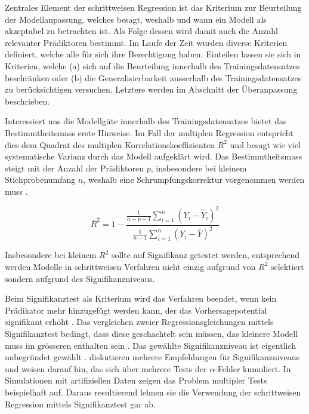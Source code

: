 Zentrales Element der schrittweisen Regression ist das Kriterium zur Beurteilung der  Modellanpassung, welches besagt, weshalb und wann ein Modell als akzeptabel zu betrachten ist. Als Folge dessen wird damit auch die Anzahl relevanter Prädiktoren bestimmt. Im Laufe der Zeit wurden diverse Kriterien definiert, welche alle für sich ihre Berechtigung haben.
Einteilen lassen sie sich in Kriterien, welche (a) sich auf die Beurteilung innerhalb des Trainingsdatensatzes beschränken oder (b) die Generalisierbarkeit ausserhalb des Trainingsdatensatzes zu berücksichtigen versuchen. Letztere werden im Abschnitt der Überanpassung beschrieben.

Interessiert uns die Modellgüte innerhalb des Trainingsdatensatzes bietet das Bestimmtheitsmass erste Hinweise. Im Fall der multiplen Regression entspricht dies dem Quadrat des multiplen Korrelationskoeffizienten $R^2$ und  besagt wie viel systematische Varianz durch das Modell aufgeklärt  wird. 
Das Bestimmtheitsmass steigt mit der Anzahl der Prädiktoren $p$, insbesondere bei kleinem Stichprobenumfang $n$, weshalb eine Schrumpfungskorrektur vorgenommen werden muss \cite[p. 451]{bortz2011}. 

\begin{equation}
\bar R^2=1-\frac{\displaystyle \frac{1}{n-p-1} \sum_{i=1}^n (Y_i-\hat{Y}_i)^2}{\displaystyle \frac{1}{n-1} \sum_{i=1}^n (Y_i-\bar{Y})^2}
\tag{korrigiertes Bestimmtheitsmass}
\end{equation}

Insbesondere bei kleinem $R^2$ sollte auf Signifikanz getestet werden, entsprechend werden Modelle in schrittweisen Verfahren nicht einzig aufgrund von $R^2$ selektiert sondern aufgrund des Signifikanzniveaus. 

Beim Signifikanztest als Kriterium wird das Verfahren beendet, wenn kein Prädikator mehr hinzugefügt werden kann, der das Vorhersagepotential signifikant erhöht \cite[p.48]{bendel1977comparison}. 
Das vergleichen zweier Regressionsgleichungen mittels Signifikanztest bedingt, dass diese geschachtelt sein müssen, das kleinere Modell muss im grösseren enthalten sein \cite[p. 508]{jacob2003applied}.
Das gewählte Signifikanzniveau ist eigentlich unbegründet gewählt \cite[p. 174]{weakliem2004introduction}.  diskutieren mehrere Empfehlungen für Signifikanzniveaus und weisen darauf hin, das sich über mehrere Tests der $\alpha$-Fehler kumuliert. 
In  Simulationen mit artifiziellen Daten zeigen  das  Problem multipler Tests beispielhaft auf. 
Daraus resultierend lehnen sie die Verwendung der schrittweisen Regression mittels Signifikanztest gar ab.

